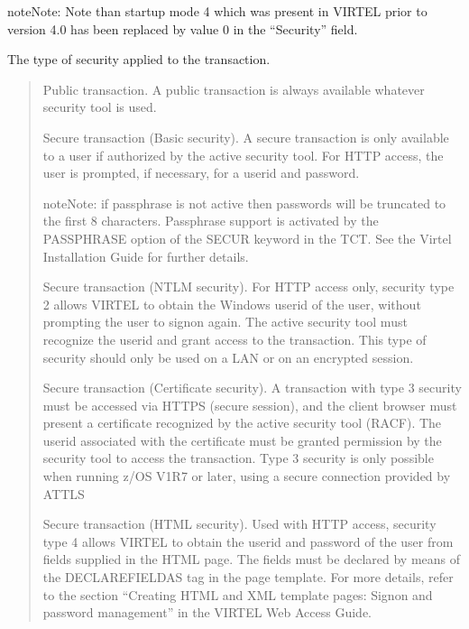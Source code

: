 \documentclass[letterpaper,10pt,english]{sphinxmanual}
\begin{document}
\begin{sphinxadmonition}{note}{Note:}
\sphinxAtStartPar
Note than startup mode 4 which was present in VIRTEL prior to version 4.0 has been replaced by value 0 in the “Security” field.
\end{sphinxadmonition}
\begin{description}
\sphinxAtStartPar
The type of security applied to the transaction.
\begin{quote}
\begin{description}
\sphinxAtStartPar
Public transaction. A public transaction is always available whatever security tool is used.

\sphinxAtStartPar
Secure transaction (Basic security). A secure transaction is only available to a user if authorized by the active security tool. For HTTP access, the user is prompted, if necessary, for a userid and password.

\begin{sphinxadmonition}{note}{Note:}
\sphinxAtStartPar
if passphrase is not active then passwords will be truncated to the first 8 characters. Passphrase support is activated by the PASSPHRASE option of the SECUR keyword in the TCT. See the Virtel Installation Guide for further details.
\end{sphinxadmonition}

\sphinxAtStartPar
Secure transaction (NTLM security). For HTTP access only, security type 2 allows VIRTEL to obtain the Windows userid of the user, without prompting the user to signon again. The active security tool must recognize the userid and grant access to the transaction. This type of security should only be used on a LAN or on an encrypted session.

\sphinxAtStartPar
Secure transaction (Certificate security). A transaction with type 3 security must be accessed via HTTPS (secure session), and the client browser must present a certificate recognized by the active security tool (RACF). The userid associated with the certificate must be granted permission by the security tool to access the transaction. Type 3 security is only possible when running z/OS V1R7 or later, using a secure connection provided by AT\sphinxhyphen{}TLS

\sphinxAtStartPar
Secure transaction (HTML security). Used with HTTP access, security type 4 allows VIRTEL to obtain the userid and password of the user from fields supplied in the HTML page. The fields must be declared by means of the DECLARE\sphinxhyphen{}FIELD\sphinxhyphen{}AS tag in the page template. For more details, refer to the section “Creating HTML and XML template pages: Signon and password management” in the VIRTEL Web Access Guide.


\end{description}
\end{quote}
\end{description}
\end{document}

